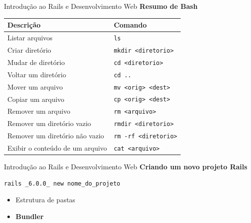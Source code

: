 \documentclass[10pt]{beamer}
\begin{document}
\begin{frame}{Introdução ao Rails e Desenvolvimento Web}
  \huge
  \textbf{Resumo de Bash}
  \vfill
  \begin{center}
    \normalsize
    \begin{tabular}{@{}ll@{}}
      \toprule
      \textbf{Descrição} & \textbf{Comando} \\
      \midrule
      Listar arquivos & \texttt{ls} \\
      Criar diretório & \texttt{mkdir <diretorio>} \\
      Mudar de diretório & \texttt{cd <diretorio>} \\
      Voltar um diretório & \texttt{cd ..} \\
      Mover um arquivo & \texttt{mv <orig> <dest>} \\
      Copiar um arquivo & \texttt{cp <orig> <dest>} \\
      Remover um arquivo & \texttt{rm <arquivo>} \\
      Remover um diretório vazio & \texttt{rmdir <diretorio>} \\
      Remover um diretório não vazio & \texttt{rm -rf <diretorio>} \\
      Exibir o conteúdo de um arquivo & \texttt{cat <arquivo>} \\
      \bottomrule
    \end{tabular}
  \end{center}
\end{frame}

\begin{frame}[fragile]{Introdução ao Rails e Desenvolvimento Web}
  \huge
  \textbf{Criando um novo projeto Rails}
  \vfill
  \Large
  \begin{verbatim}
rails _6.0.0_ new nome_do_projeto
  \end{verbatim}
  \vfill
  \begin{itemize}
    \item Estrutura de pastas
    \item \textbf{Bundler}
  \end{itemize}
\end{frame}
\end{document}
